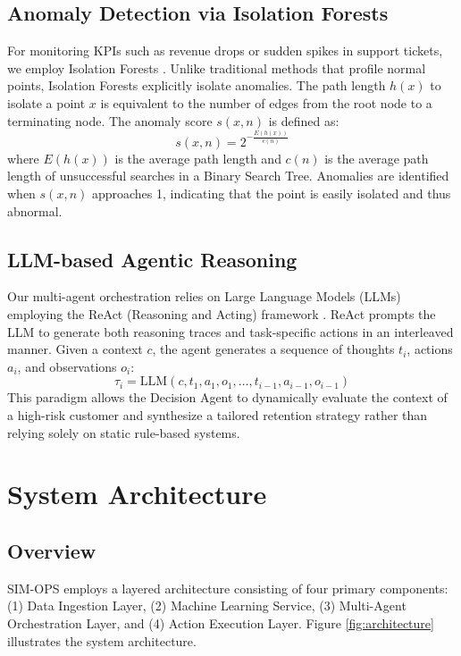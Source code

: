 \documentclass[conference]{IEEEtran}
\begin{document}
\subsection{Anomaly Detection via Isolation Forests}
For monitoring KPIs such as revenue drops or sudden spikes in support tickets, we employ Isolation Forests \cite{liu2008isolation}. Unlike traditional methods that profile normal points, Isolation Forests explicitly isolate anomalies. The path length $h(x)$ to isolate a point $x$ is equivalent to the number of edges from the root node to a terminating node. The anomaly score $s(x, n)$ is defined as:
\begin{equation}
s(x, n) = 2^{-\frac{E(h(x))}{c(n)}}
\end{equation}
where $E(h(x))$ is the average path length and $c(n)$ is the average path length of unsuccessful searches in a Binary Search Tree. Anomalies are identified when $s(x, n)$ approaches 1, indicating that the point is easily isolated and thus abnormal.

\subsection{LLM-based Agentic Reasoning}
Our multi-agent orchestration relies on Large Language Models (LLMs) employing the ReAct (Reasoning and Acting) framework \cite{yao2022react}. ReAct prompts the LLM to generate both reasoning traces and task-specific actions in an interleaved manner. Given a context $c$, the agent generates a sequence of thoughts $t_i$, actions $a_i$, and observations $o_i$:
\begin{equation}
\tau_i = \text{LLM}(c, t_1, a_1, o_1, \dots, t_{i-1}, a_{i-1}, o_{i-1})
\end{equation}
This paradigm allows the Decision Agent to dynamically evaluate the context of a high-risk customer and synthesize a tailored retention strategy rather than relying solely on static rule-based systems.

\section{System Architecture}

\subsection{Overview}
SIM-OPS employs a layered architecture consisting of four primary components: (1) Data Ingestion Layer, (2) Machine Learning Service, (3) Multi-Agent Orchestration Layer, and (4) Action Execution Layer. Figure \ref{fig:architecture} illustrates the system architecture.
\end{document}

